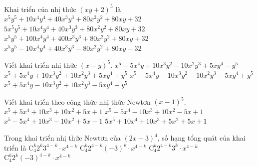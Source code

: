\begin{ex}%
	Khai triển của nhị thức  $(x y+2)^5$ là
	 \choice
		{\True $x^5 y^5+10 x^4 y^4+40 x^3  y^3+80 x^2 y^2+80 x y+32$}
		{$5  x^5 y^5+10 x^4 y^4+40 x^3 y^3+80 x^2 y^2+80 x y+32$}
		{$x^5 y^5+100 x^4  y^4+400 x^3 y^3+80 x^2 y^2+80 x y+32$}
		{$x^5 y^5-10 x^4 y^4+40 x^3 y^3-80 x^2 y^2+80 x  y-32$}
\end{ex}

\begin{ex}%
	Viết khai triển nhị  thức $(x-y)^5$.
	 \choice
		{\True $x^5-5 x^4 y+10 x^3 y^2-10 x^2 y^3+5  x y^4-y^5$}
		{$x^5+5 x^4 y+10  x^3 y^2+10 x^2 y^3+5 x y^4+y^5$}
		{$x^5-5 x^4 y-10 x^3 y^2-10  x^2 y^3-5 x y^4+y^5$}
		{$x^5+5 x^4  y-10 x^3 y^2+10 x^2 y^3-5 x y^4+y^5$}
\end{ex}

\begin{ex}%
	Viết khai triển theo công  thức nhị thức Newtơn $(x-1)^5$.
	\choice 
		{$x^5+5x^4+10x^3+10x^2+5x+1$} 
		{$x^5-5x^4-10x^3+10x^2-5x+1$} 
		 {\True $x^5-5x^4+10x^3-10x^2+5x-1$}
		 {$5x^5+10x^4+10x^3+5x^2+5x+1$}
\end{ex}

\begin{ex}%
	Trong khai triển nhị thức Newtơn của  $(2x-3)^4$, số hạng tổng quát của khai triển là
	\choice 
		 {$\mathrm{C}_4^k2^k3^{4-k}\cdot x^{4-k}$}
		{\True $\mathrm{C}_4^k2^{4-k}(-3)^k\cdot  x^{4-k}$}
		{$\mathrm{C}_4^k2^{4-k}3^k\cdot x^{4-k}$} 
		{$\mathrm{C}_4^k2^k\left(-3\right)^{4-k}\cdot  x^{4-k}$}
\end{ex}

